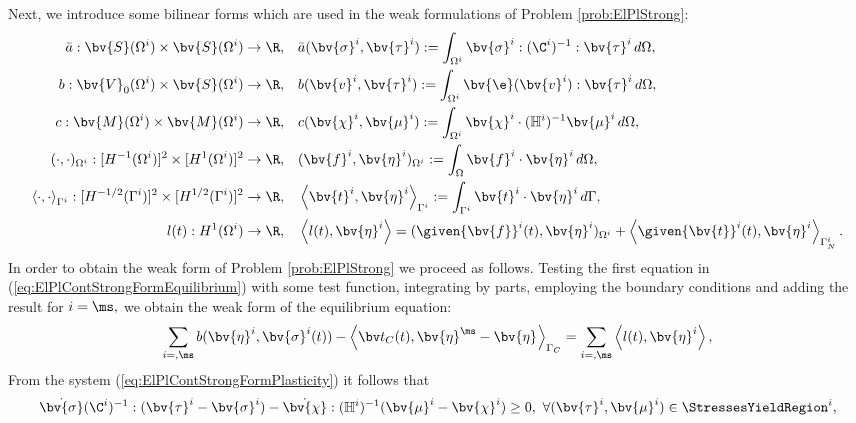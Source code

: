 Next, we introduce some bilinear forms which are used in the weak formulations of  Problem \ref{prob:ElPlStrong}:
\begin{align*}
\bar{a}:\bv{S}(\Omega^i)\times \bv{S}(\Omega^i)\rightarrow \R,\quad &  \bar{a}(\bv{\sigma}^i, \bv{\tau}^i):= \int_{\Omega^i} \bv{\sigma}^i : (\C^{i})^{-1}:\bv{\tau}^i\, d\Omega,\\
b:\bv{V}_0(\Omega^i)\times \bv{S}(\Omega^i)\rightarrow \R,\quad &  b(\bv{v}^i, \bv{\tau}^i):= \int_{\Omega^i} \bv{\e}(\bv{v}^i) : \bv{\tau}^i\, d\Omega,\\
c:\bv{M}(\Omega^i)\times \bv{M}(\Omega^i)\rightarrow \R,\quad &  c(\bv{\chi}^i, \bv{\mu}^i):= \int_{\Omega^i} \bv{\chi}^i\cdot(\mathbb{H}^i)^{-1}  \bv{\mu}^i\, d\Omega,\\
(\cdot,\cdot)_{\Omega^i}:[H^{-1}(\Omega^i)]^2\times [H^1(\Omega^i)]^2 \rightarrow \R,\quad & ( \bv{f}^i, \bv{\eta}^i)_{\Omega^i} := \int_{\Omega} \bv{f}^i \cdot \bv{\eta}^i \, d\Omega,\\
\left\langle \cdot,\cdot\right\rangle_{\Gamma^i}:[H^{-1/2}(\Gamma^i)]^2\times [H^{1/2}(\Gamma^i)]^2 \rightarrow \R,\quad &\left\langle \bv{t}^i, \bv{\eta}^i \right\rangle_{\Gamma^i} := \int_{\Gamma^i} \bv{t}^i \cdot \bv{\eta}^i \, d\Gamma, \\
l(t):H^{1}(\Omega^i) \rightarrow \R,\quad &  \left\langle l(t),\bv{\eta}^{i}\right\rangle=(\given{\bv{f}}^i(t), \bv{\eta}^i)_{\Omega^i}
+ \left\langle \given{\bv{t}}^i(t), \bv{\eta}^i \right\rangle_{\Gamma_N^i}.
\end{align*}
In order to obtain the weak form of Problem  \ref{prob:ElPlStrong} we proceed as follows. Testing the first equation in (\ref{eq:ElPlContStrongFormEquilibrium}) with some test function, integrating by parts, employing the boundary  conditions and adding the result for $i=\ms,\sl$ we obtain  the weak form of the equilibrium equation:
\begin{equation}
\sum \limits_{i=\sl,\ms}  b(\bv{\eta}^i,\bv{\sigma}^i(t))- \left\langle \bv t_C(t), \bv{\eta}^{\ms}-\bv{\eta}^{\sl} \right\rangle_{\Gamma_C}    =\sum \limits_{i=\sl,\ms} \left\langle l(t),\bv{\eta}^{i}\right\rangle, \label{eq:temp:ElPlContWeakFormMech}
\end{equation}
From the system (\ref{eq:ElPlContStrongFormPlasticity}) it follows that
\begin{equation}\label{eq:temp:ElPlContStrongFormPlasticity}
\dot{\bv{\sigma}}(\C^{i})^{-1}:(\bv{\tau}^{i}-\bv{\sigma}^{i})-\dot{\bv{\chi}}:(\mathbb{H}^{i})^{-1}(\bv{\mu}^{i}-\bv{\chi}^{i})\geq 0,~\forall (\bv{\tau}^{i},\bv{\mu}^{i})\in \StressesYieldRegion^{i},
\end{equation}
